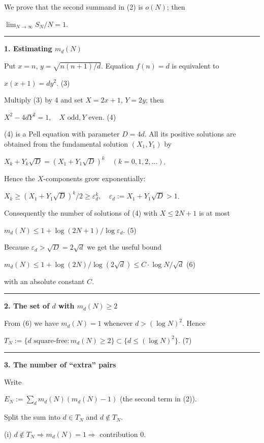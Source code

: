 \documentclass[12pt,a4paper]{article}
\theoremstyle{definition}
\begin{document}
    We prove that the second summand in (2) is $o(N)$; then

    $\lim_{N \to \infty} S_N/N = 1$.

    \hrule

    \textbf{1. Estimating $m_d(N)$}

    Put $x = n$, $y = \sqrt{n(n+1)/d}$.
    Equation $f(n) = d$ is equivalent to

    $x(x+1) = dy^2$. \qquad (3)

    Multiply (3) by 4 and set $X = 2x+1$, $Y = 2y$; then

    $X^2 - 4dY^2 = 1, \quad X \text{ odd}, Y \text{ even}$. \qquad (4)

    (4) is a Pell equation with parameter $D = 4d$.
    All its positive solutions are obtained from the
    fundamental solution $(X_1, Y_1)$ by

    $X_k + Y_k\sqrt{D} = (X_1 + Y_1\sqrt{D})^k \quad (k = 0,1,2,\ldots)$.

    Hence the $X$-components grow exponentially:

    $X_k \geq (X_1 + Y_1\sqrt{D})^k/2 \geq \varepsilon_d^k, \quad \varepsilon_d := X_1 + Y_1\sqrt{D} > 1$.

    Consequently the number of solutions of (4) with
    $X \leq 2N+1$ is at most

    $m_d(N) \leq 1 + \log(2N+1)/\log \varepsilon_d$. \qquad (5)

    Because $\varepsilon_d > \sqrt{D} = 2\sqrt{d}$ we get the useful bound

    $m_d(N) \leq 1 + \log(2N)/\log(2\sqrt{d}) \leq C \cdot \log N/\sqrt{d}$ \qquad (6)

    with an absolute constant $C$.

    \hrule

    \textbf{2. The set of $d$ with $m_d(N) \geq 2$}

    From (6) we have $m_d(N) = 1$ whenever $d > (\log N)^2$.
    Hence

    $T_N := \{d \text{ square-free} : m_d(N) \geq 2\} \subset \{d \leq (\log N)^2\}$. \qquad (7)

    \hrule

    \textbf{3. The number of ``extra'' pairs}

    Write

    $E_N := \sum_d m_d(N)(m_d(N)-1)$ \quad (the second term in (2)).

    Split the sum into $d \in T_N$ and $d \notin T_N$.

    (i) $d \notin T_N \Rightarrow m_d(N) = 1 \Rightarrow$ contribution 0.
\end{document}

